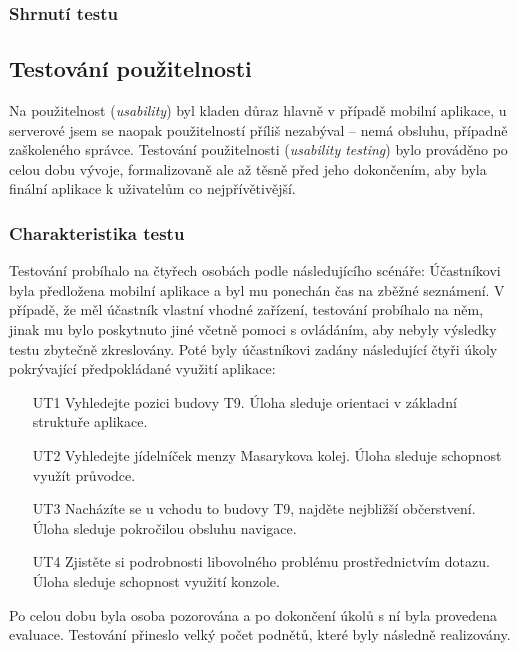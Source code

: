 \subsubsection{Shrnutí testu}


\subsection{Testování použitelnosti}
Na použitelnost (\textit{usability}) byl kladen důraz hlavně v případě mobilní aplikace, u serverové jsem se naopak použitelností příliš nezabýval -- nemá obsluhu, případně zaškoleného správce. Testování použitelnosti (\textit{usability testing}) bylo prováděno po celou dobu vývoje, formalizovaně ale až těsně před jeho dokončením, aby byla finální aplikace k uživatelům co nejpřívětivější.

\subsubsection{Charakteristika testu}
Testování probíhalo na čtyřech osobách podle následujícího scénáře: Účastníkovi byla předložena mobilní aplikace a byl mu ponechán čas na zběžné seznámení. V případě, že měl účastník vlastní vhodné zařízení, testování probíhalo na něm, jinak mu bylo poskytnuto jiné včetně pomoci s ovládáním, aby nebyly výsledky testu zbytečně zkreslovány. Poté byly účastníkovi zadány následující čtyři úkoly pokrývající předpokládané využití aplikace:
\begin{enumerate}
 \item[UT1] Vyhledejte pozici budovy T9. Úloha sleduje orientaci v základní struktuře aplikace.
 \item[UT2] Vyhledejte jídelníček menzy Masarykova kolej. Úloha sleduje schopnost využít průvodce.
 \item[UT3] Nacházíte se u vchodu to budovy T9, najděte nejbližší občerstvení. Úloha sleduje pokročilou obsluhu navigace.
 \item[UT4] Zjistěte si podrobnosti libovolného problému prostřednictvím  dotazu. Úloha sleduje schopnost využití  konzole.
\end{enumerate}
Po celou dobu byla osoba pozorována a po dokončení úkolů s ní byla provedena evaluace. Testování přineslo velký počet podnětů, které byly následně realizovány.

